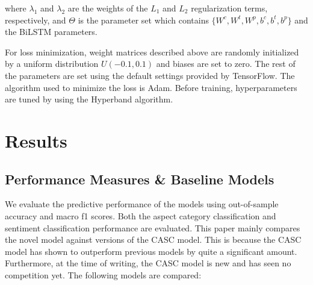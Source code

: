 \documentclass[american, oneside]{ecsgdp}
\begin{document}
\noindent where $\lambda_1$ and $\lambda_2$ are the weights of the $L_1$ and $L_2$ regularization terms, respectively, and $\Theta$ is the parameter set which contains $\{W^c, W^t, W^p, b^c, b^t, b^p\}$ and the BiLSTM parameters.

For loss minimization, weight matrices described above are randomly initialized by a uniform distribution $U(-0.1, 0.1)$ and biases are set to zero. The rest of the parameters are set using the default settings provided by TensorFlow. The algorithm used to minimize the loss is Adam. %
Before training, hyperparameters are tuned by using the Hyperband algorithm. %






\chapter{Results} \label{chap:results}

\section{Performance Measures \& Baseline Models} \label{sec:baselines}
We evaluate the predictive performance of the models using out-of-sample accuracy and macro f1 scores. Both the aspect category classification and sentiment classification performance are evaluated. This paper mainly compares the novel model against versions of the CASC model. This is because the CASC model has shown to outperform previous models by quite a significant amount. Furthermore, at the time of writing, the CASC model is new and has seen no competition yet. The following models are compared:
\end{document}
